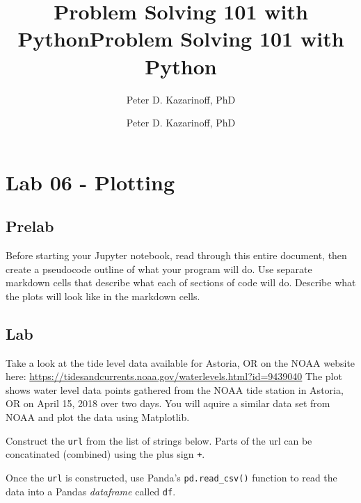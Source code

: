 \documentclass[11pt]{article}
\title{Problem Solving 101 with Python}
\author{Peter D. Kazarinoff, PhD}
\date{}
\title{Problem Solving 101 with Python}
\author{Peter D. Kazarinoff, PhD}
\date{}
\begin{document}
    
    
    

    
    

    
    \hypertarget{lab-06---plotting}{%
\section{Lab 06 - Plotting}\label{lab-06---plotting}}

    \hypertarget{prelab}{%
\subsection{Prelab}\label{prelab}}

Before starting your Jupyter notebook, read through this entire
document, then create a pseudocode outline of what your program will do.
Use separate markdown cells that describe what each of sections of code
will do. Describe what the plots will look like in the markdown cells.

    \hypertarget{lab}{%
\subsection{Lab}\label{lab}}

Take a look at the tide level data available for Astoria, OR on the NOAA
website here:
\url{https://tidesandcurrents.noaa.gov/waterlevels.html?id=9439040} The
plot shows water level data points gathered from the NOAA tide station
in Astoria, OR on April 15, 2018 over two days. You will aquire a
similar data set from NOAA and plot the data using Matplotlib.

Construct the \texttt{url} from the list of strings below. Parts of the
url can be concatinated (combined) using the plus sign \texttt{+}.

Once the \texttt{url} is constructed, use Panda's
\texttt{pd.read\_csv()} function to read the data into a Pandas
\emph{dataframe} called \texttt{df}.
\end{document}
